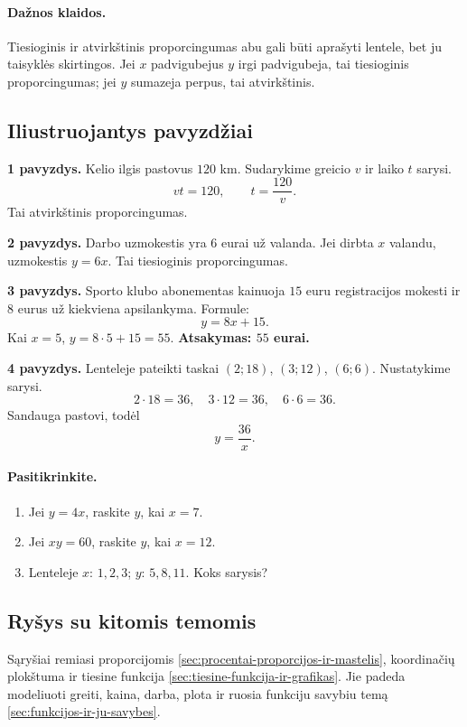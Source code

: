\paragraph{Dažnos klaidos.}
Tiesioginis ir atvirkštinis proporcingumas abu gali būti aprašyti lentele, bet ju taisyklės skirtingos. Jei $x$ padvigubejus $y$ irgi padvigubeja, tai tiesioginis proporcingumas; jei $y$ sumazeja perpus, tai atvirkštinis.

\subsection{Iliustruojantys pavyzdžiai}
\textbf{1 pavyzdys.} Kelio ilgis pastovus $120$ km. Sudarykime greicio $v$ ir laiko $t$ sarysi.
\[
vt=120,\qquad t=\frac{120}{v}.
\]
Tai atvirkštinis proporcingumas.

\textbf{2 pavyzdys.} Darbo uzmokestis yra $6$ eurai už valanda. Jei dirbta $x$ valandu, uzmokestis $y=6x$. Tai tiesioginis proporcingumas.

\textbf{3 pavyzdys.} Sporto klubo abonementas kainuoja $15$ euru registracijos mokesti ir $8$ eurus už kiekviena apsilankyma. Formule:
\[
y=8x+15.
\]
Kai $x=5$, $y=8\cdot5+15=55$.
\textbf{Atsakymas: $55$ eurai.}

\textbf{4 pavyzdys.} Lenteleje pateikti taskai $(2;18)$, $(3;12)$, $(6;6)$. Nustatykime sarysi.
\[
2\cdot18=36,\quad 3\cdot12=36,\quad 6\cdot6=36.
\]
Sandauga pastovi, todėl
\[
y=\frac{36}{x}.
\]

\paragraph{Pasitikrinkite.}
\begin{enumerate}[label=\alph*)]
\item Jei $y=4x$, raskite $y$, kai $x=7$.
\item Jei $xy=60$, raskite $y$, kai $x=12$.
\item Lenteleje $x$: $1,2,3$; $y$: $5,8,11$. Koks sarysis?
\end{enumerate}

\subsection{Ryšys su kitomis temomis}
Sąryšiai remiasi proporcijomis \ref{sec:procentai-proporcijos-ir-mastelis}, koordinačių plokštuma ir tiesine funkcija \ref{sec:tiesine-funkcija-ir-grafikas}. Jie padeda modeliuoti greiti, kaina, darba, plota ir ruosia funkciju savybiu temą \ref{sec:funkcijos-ir-ju-savybes}.

